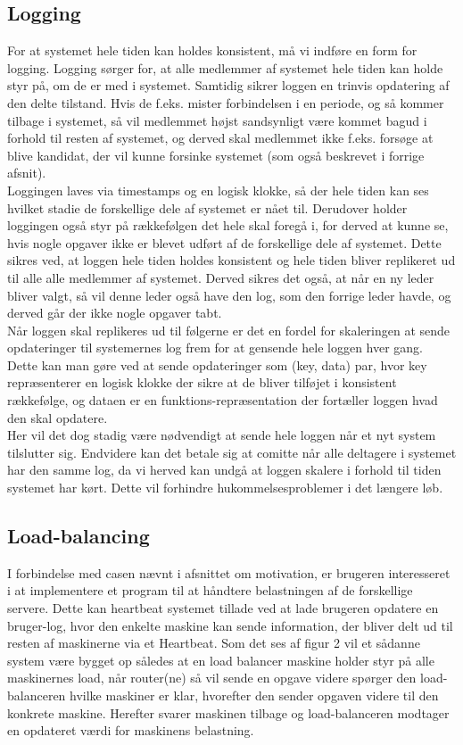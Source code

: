\documentclass[a4paper,12pt]{article}
\begin{document}
\subsection{Logging}
For at systemet hele tiden kan holdes konsistent, må vi indføre en form for logging. Logging sørger for, at alle medlemmer af systemet hele tiden kan holde styr på, om de er med i systemet. Samtidig sikrer loggen en trinvis opdatering af den delte tilstand. Hvis de f.eks. mister forbindelsen i en periode, og så kommer tilbage i systemet, så vil medlemmet højst sandsynligt være kommet bagud i forhold til resten af systemet, og derved skal medlemmet ikke f.eks. forsøge at blive kandidat, der vil kunne forsinke systemet (som også beskrevet i forrige afsnit). 
\\
Loggingen laves via timestamps og en logisk klokke, så der hele tiden kan ses hvilket stadie de forskellige dele af systemet er nået til. Derudover holder loggingen også styr på rækkefølgen det hele skal foregå i, for derved at kunne se, hvis nogle opgaver ikke er blevet udført af de forskellige dele af systemet. Dette sikres ved, at loggen hele tiden holdes konsistent og hele tiden bliver replikeret ud til alle alle medlemmer af systemet. Derved sikres det også, at når en ny leder bliver valgt, så vil denne leder også have den log, som den forrige leder havde, og derved går der ikke nogle opgaver tabt.
\\[5px]
Når loggen skal replikeres ud til følgerne er det en fordel for skaleringen at sende opdateringer til systemernes log frem for at gensende hele loggen hver gang.
Dette kan man gøre ved at sende opdateringer som (key, data) par, hvor key repræsenterer en logisk klokke der sikre at de bliver tilføjet i konsistent rækkefølge, og dataen er en funktions-repræsentation der fortæller loggen hvad den skal opdatere.
\\
Her vil det dog stadig være nødvendigt at sende hele loggen når et nyt system tilslutter sig. Endvidere kan det betale sig at comitte når alle deltagere i systemet har den samme log, da vi herved kan undgå at loggen skalere i forhold til tiden systemet har kørt. Dette vil forhindre hukommelsesproblemer i det længere løb.


\subsection{Load-balancing}
I forbindelse med casen nævnt i afsnittet om motivation, er brugeren interesseret i at implementere et program til at håndtere belastningen af de forskellige servere. Dette kan heartbeat systemet tillade ved at lade brugeren opdatere en bruger-log, hvor den enkelte maskine kan sende information, der bliver delt ud til resten af maskinerne via et Heartbeat. Som det ses af figur 2 vil et sådanne system være bygget op således at en load balancer maskine holder styr på alle maskinernes load, når router(ne) så vil sende en opgave videre spørger den load-balanceren hvilke maskiner er klar, hvorefter den sender opgaven videre til den konkrete maskine.
Herefter svarer maskinen tilbage og load-balanceren modtager en opdateret værdi for maskinens belastning.
\end{document}
